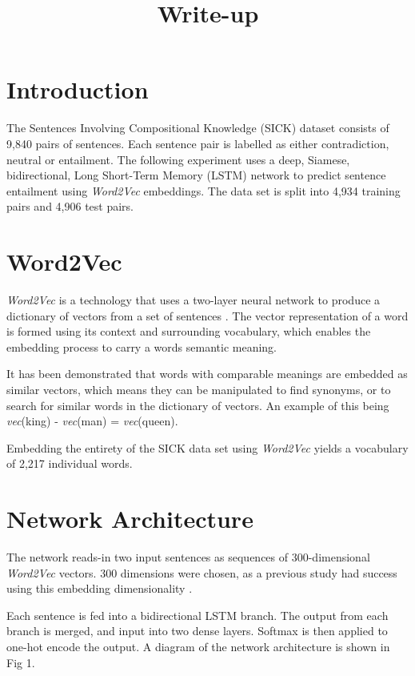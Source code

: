 \documentclass[a4paper,11pt]{article}
\title{Write-up}
\author{}
\begin{document}
\graphicspath{{images/}}
\section{Introduction}
The Sentences Involving Compositional Knowledge (SICK) dataset consists of 9,840 pairs of sentences. Each sentence pair is labelled as either contradiction, neutral or entailment. The following experiment uses a deep, Siamese, bidirectional, Long Short-Term Memory (LSTM) network to predict sentence entailment using \emph{Word2Vec} embeddings. The data set is split into 4,934 training pairs and 4,906 test pairs.

\section{Word2Vec}
\emph{Word2Vec} is a technology that uses a two-layer neural network to produce a dictionary of vectors from a set of sentences \cite{mikolov2013distributed}. The vector representation of a word is formed using its context and surrounding vocabulary, which enables the embedding process to carry a words semantic meaning. 


It has been demonstrated that words with comparable meanings are embedded as similar vectors, which means they can be manipulated to find synonyms, or to search for similar words in the dictionary of vectors. An example of this being \emph{vec}(king) - \emph{vec}(man) = \emph{vec}(queen).\par  Embedding the entirety of the SICK data set using \emph{Word2Vec} yields a vocabulary of 2,217 individual words.

\section{Network Architecture}
The network reads-in two input sentences as sequences of 300-dimensional \emph{Word2Vec} vectors. 300 dimensions were chosen, as a previous study had success using this embedding dimensionality \cite{mueller2016siamese}. \par Each sentence is fed into a bidirectional LSTM branch. The output from each branch is merged, and input into two dense layers. Softmax is then applied to one-hot encode the output. A diagram of the network architecture is shown in Fig 1.  
\end{document}
